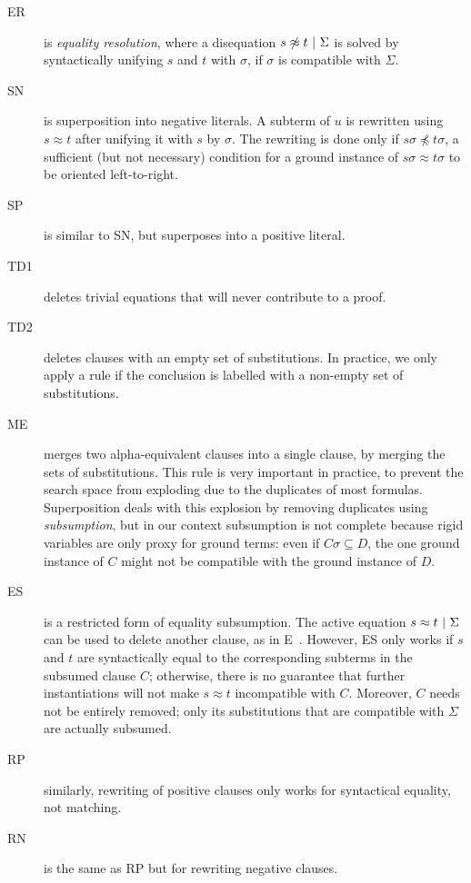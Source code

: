 \begin{description}
  \item[ER] is {\em equality resolution},
    where a disequation $s \not\approx t ~|~ \Sigma$
    is solved by syntactically unifying $s$ and $t$ with $\sigma$,
    if $\sigma$ is compatible with $\Sigma$.
  \item[SN] is superposition into negative literals. A subterm of $u$
    is rewritten using $s \approx t$ after unifying it with $s$
    by $\sigma$.
    The rewriting is done only if $s\sigma \not\preceq t\sigma$,
    a sufficient (but not necessary) condition for a
    ground instance of $s\sigma \approx t\sigma$
    to be oriented left-to-right.
  \item[SP] is similar to SN, but superposes into a positive literal.
  \item[TD1] deletes trivial equations that will never contribute to a proof.
  \item[TD2] deletes clauses with an empty set of substitutions.
    In practice, we only apply a rule if the conclusion is labelled with a
    non-empty set of substitutions.
  \item[ME] merges two alpha-equivalent clauses into a single clause,
    by merging the sets of substitutions.
    This rule is very important in practice, to prevent the search space
    from exploding due to the duplicates of most formulas.
    Superposition deals with this explosion by removing duplicates using
    {\em subsumption}, but in our context subsumption is not complete
    because rigid variables are only proxy for ground terms:
    even if $C\sigma \subseteq D$, the one ground instance of $C$ might not
    be compatible with the ground instance of $D$.
  \item[ES] is a restricted form of equality subsumption. The active
    equation $ s\approx t ~|~ \Sigma $ can be used to delete another clause, as
    in E~\cite{e_brainiac_prover}.
    However, ES only works if $s$ and $t$ are syntactically equal to the
    corresponding subterms in the subsumed clause $C$; otherwise, there is no
    guarantee that further instantiations will not make
    $s\approx t$ incompatible with $C$.
    Moreover, $C$ needs not be entirely removed; only its substitutions
    that are compatible with $\Sigma$ are actually subsumed.
  \item[RP] similarly, rewriting of positive clauses only  works for
    syntactical equality, not matching.
  \item[RN] is the same as RP but for rewriting negative clauses.
\end{description}

